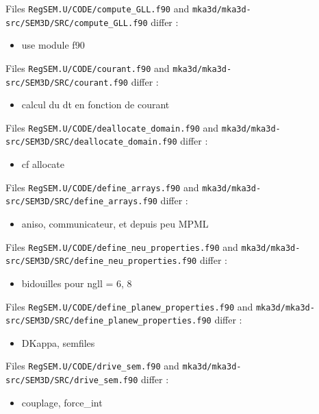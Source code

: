 \documentclass[10pt,a4paper,english]{article}
\begin{document}
Files \texttt{RegSEM.U/CODE/compute{\_}GLL.f90} and \texttt{mka3d/mka3d-src/SEM3D/SRC/compute{\_}GLL.f90} differ :
\begin{itemize}
\item {} 
use module f90

\end{itemize}

Files \texttt{RegSEM.U/CODE/courant.f90} and \texttt{mka3d/mka3d-src/SEM3D/SRC/courant.f90} differ :
\begin{itemize}
\item {} 
calcul du dt en fonction de courant

\end{itemize}

Files \texttt{RegSEM.U/CODE/deallocate{\_}domain.f90} and \texttt{mka3d/mka3d-src/SEM3D/SRC/deallocate{\_}domain.f90} differ :
\begin{itemize}
\item {} 
cf allocate

\end{itemize}

Files \texttt{RegSEM.U/CODE/define{\_}arrays.f90} and \texttt{mka3d/mka3d-src/SEM3D/SRC/define{\_}arrays.f90} differ :
\begin{itemize}
\item {} 
aniso, communicateur, et depuis peu MPML

\end{itemize}

Files \texttt{RegSEM.U/CODE/define{\_}neu{\_}properties.f90} and \texttt{mka3d/mka3d-src/SEM3D/SRC/define{\_}neu{\_}properties.f90} differ :
\begin{itemize}
\item {} 
bidouilles pour ngll = 6, 8

\end{itemize}

Files \texttt{RegSEM.U/CODE/define{\_}planew{\_}properties.f90} and \texttt{mka3d/mka3d-src/SEM3D/SRC/define{\_}planew{\_}properties.f90} differ :
\begin{itemize}
\item {} 
DKappa, semfiles

\end{itemize}

Files \texttt{RegSEM.U/CODE/drive{\_}sem.f90} and \texttt{mka3d/mka3d-src/SEM3D/SRC/drive{\_}sem.f90} differ :
\begin{itemize}
\item {} 
couplage, force{\_}int

\end{itemize}
\end{document}
